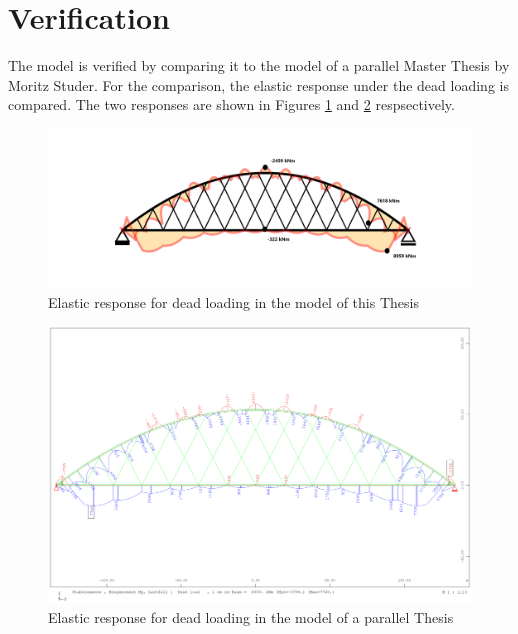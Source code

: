 \newpage
\section{Verification} \label{app:model_verification}
The model is verified by comparing it to the model of a parallel Master Thesis by Moritz Studer. For the comparison, the elastic response under the dead loading is compared. The two responses are shown in Figures \ref{fig:verification_1} and \ref{fig:verification_2} respsectively.

\begin{figure}[H]
    \centering
    \includegraphics[trim={12cm 5cm 10cm 5cm},clip, width=\textwidth]{calculations/model comparison/dead_load.png}
    \caption{Elastic response for dead loading in the model of this Thesis}
    \label{fig:verification_1}
\end{figure}

\begin{figure}[H]
    \centering
    \includegraphics[trim={0.3cm 4cm 0.8cm 3.5cm},clip, width=\textwidth]{calculations/model comparison/dead_load_comparison.PNG}
    \caption{Elastic response for dead loading in the model of a parallel Thesis}
    \label{fig:verification_2}
\end{figure}

